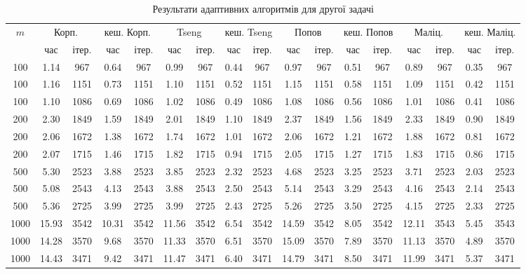 \begin{table}[H]
    \centering
    \begin{tabular}{||c||c|c|c|c||c|c|c|c||c|c|c|c||c|c|c|c||} \hline \hline
        \multirow{2}{*}{$m$} & \multicolumn{2}{c|}{Корп.} & \multicolumn{2}{c||}{кеш. Корп.} & \multicolumn{2}{c|}{Tseng} & \multicolumn{2}{c||}{кеш. Tseng} & \multicolumn{2}{c|}{Попов} & \multicolumn{2}{c||}{кеш. Попов} & \multicolumn{2}{c|}{Маліц.} & \multicolumn{2}{c||}{кеш. Маліц.} \\ \cline{2-17}
         & час & ітер. & час & ітер. & час & ітер. & час & ітер. & час & ітер. & час & ітер. & час & ітер. & час & ітер. \\ \hline \hline
        100 & 1.14 & 967 & 0.64 & 967 & 0.99 & 967 & 0.44 & 967 & 0.97 & 967 & 0.51 & 967 & 0.89 & 967 & 0.35 & 967 \\ \hline
        100 & 1.16 & 1151 & 0.73 & 1151 & 1.10 & 1151 & 0.52 & 1151 & 1.15 & 1151 & 0.58 & 1151 & 1.09 & 1151 & 0.42 & 1151 \\ \hline
        100 & 1.10 & 1086 & 0.69 & 1086 & 1.02 & 1086 & 0.49 & 1086 & 1.08 & 1086 & 0.56 & 1086 & 1.01 & 1086 & 0.41 & 1086 \\ \hline
        200 & 2.30 & 1849 & 1.59 & 1849 & 2.01 & 1849 & 1.10 & 1849 & 2.37 & 1849 & 1.56 & 1849 & 2.33 & 1849 & 0.90 & 1849 \\ \hline
        200 & 2.06 & 1672 & 1.38 & 1672 & 1.74 & 1672 & 1.01 & 1672 & 2.06 & 1672 & 1.21 & 1672 & 1.88 & 1672 & 0.81 & 1672 \\ \hline
        200 & 2.07 & 1715 & 1.46 & 1715 & 1.82 & 1715 & 0.94 & 1715 & 2.05 & 1715 & 1.27 & 1715 & 1.83 & 1715 & 0.86 & 1715 \\ \hline
        500 & 5.30 & 2523 & 3.88 & 2523 & 3.85 & 2523 & 2.32 & 2523 & 4.68 & 2523 & 3.25 & 2523 & 3.71 & 2523 & 2.03 & 2523 \\ \hline
        500 & 5.08 & 2543 & 4.13 & 2543 & 3.88 & 2543 & 2.50 & 2543 & 5.14 & 2543 & 3.29 & 2543 & 4.16 & 2543 & 2.14 & 2543 \\ \hline
        500 & 5.36 & 2725 & 3.99 & 2725 & 3.99 & 2725 & 2.43 & 2725 & 5.26 & 2725 & 3.50 & 2725 & 4.15 & 2725 & 2.33 & 2725 \\ \hline
        1000 & 15.93 & 3542 & 10.31 & 3542 & 11.56 & 3542 & 6.54 & 3542 & 14.59 & 3542 & 8.05 & 3542 & 12.11 & 3543 & 5.45 & 3543 \\ \hline
        1000 & 14.28 & 3570 & 9.68 & 3570 & 11.33 & 3570 & 6.51 & 3570 & 15.09 & 3570 & 7.89 & 3570 & 11.13 & 3570 & 4.89 & 3570 \\ \hline
        1000 & 14.43 & 3471 & 9.42 & 3471 & 11.47 & 3471 & 6.40 & 3471 & 14.79 & 3471 & 8.50 & 3471 & 11.99 & 3471 & 5.37 & 3471 \\ \hline
        \hline
    \end{tabular}
    \caption{Результати адаптивних алгоритмів для другої задачі}
    \label{tab:2-adapt}
\end{table}